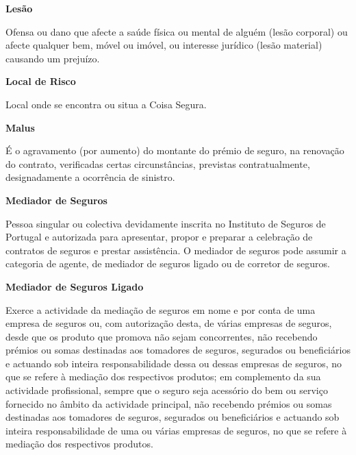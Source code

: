 \begin{description}
\item \textbf{Lesão}

Ofensa ou dano que afecte a saúde física ou mental de alguém (lesão corporal) ou afecte qualquer bem, móvel ou imóvel, ou interesse jurídico (lesão material) causando um prejuízo.
\end{description}

\begin{description}
\item \textbf{Local de Risco}

Local onde se encontra ou situa a Coisa Segura.
\end{description}

\begin{description}
\item \textbf{Malus}

É o agravamento (por aumento) do montante do prémio de seguro, na renovação do contrato, verificadas certas circunstâncias, previstas contratualmente, designadamente a ocorrência de sinistro.
\end{description}

\begin{description}
\item \textbf{Mediador de Seguros}

Pessoa singular ou colectiva devidamente inscrita no Instituto de Seguros de Portugal e autorizada para apresentar, propor e preparar a celebração de contratos de seguros e prestar assistência. O mediador de seguros pode assumir a categoria de agente, de mediador de seguros ligado ou de corretor de seguros.
\end{description}

\begin{description}
\item \textbf{Mediador de Seguros Ligado}

Exerce a actividade da mediação de seguros em nome e por conta de uma empresa de seguros ou, com autorização desta, de várias empresas de seguros, desde que os produto que promova não sejam concorrentes, não recebendo prémios ou somas destinadas aos tomadores de seguros, segurados ou beneficiários e actuando sob inteira responsabilidade dessa ou dessas empresas de seguros, no que se refere à mediação dos respectivos produtos; em complemento da sua actividade profissional, sempre que o seguro seja acessório do bem ou serviço fornecido no âmbito da actividade principal, não recebendo prémios ou somas destinadas aos tomadores de seguros, segurados ou beneficiários e actuando sob inteira responsabilidade de uma ou várias empresas de seguros, no que se refere à mediação dos respectivos produtos.
\end{description}

